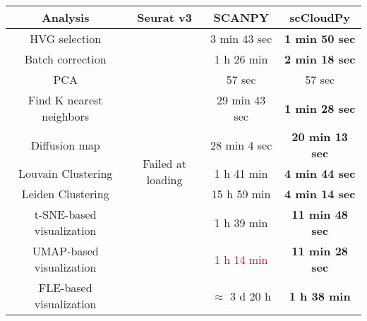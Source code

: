 \documentclass[10pt]{article}
\begin{document}
\begin{table}[H]
	\centering
	\begin{tabular}{|c|c|c|c|}
		\hline
		Analysis  & Seurat v3 & SCANPY & scCloudPy\\
		\hline \hline
		HVG selection  & \multirow{10}{*}{Failed at loading} & 3 min 43 sec  & \textbf{1 min 50 sec}  \\
		\cline{1-1}\cline{3-4}
		Batch correction  & & 1 h 26 min  & \textbf{2 min 18 sec}  \\
		\cline{1-1}\cline{3-4}
		PCA   & & 57 sec  & 57 sec  \\
		\cline{1-1}\cline{3-4}
		Find K nearest neighbors &  & 29 min 43 sec  & \textbf{1 min 28 sec}  \\
		\cline{1-1}\cline{3-4}
		Diffusion map   & & 28 min 4 sec  & \textbf{20 min 13 sec}  \\
		\cline{1-1}\cline{3-4}
		Louvain Clustering &  & 1 h 41 min  & \textbf{4 min 44 sec}  \\
		\cline{1-1}\cline{3-4}
		Leiden Clustering & & 15 h 59 min  & \textbf{4 min 14 sec}  \\
		\cline{1-1}\cline{3-4}
		t-SNE-based visualization  & & 1 h 39 min  & \textbf{11 min 48 sec}  \\
		\cline{1-1}\cline{3-4}
		UMAP-based visualization  & & \textcolor{red}{1 h 14 min}   & \textbf{11 min 28 sec}  \\
		\cline{1-1}\cline{3-4}
		FLE-based visualization   & & $\approx$ 3 d 20 h  & \textbf{1 h 38 min}  \\
		\hline
	\end{tabular}
\end{table}
\end{document}
